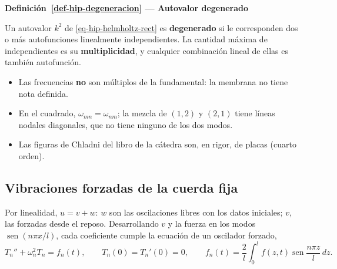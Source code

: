 \documentclass[
  spanish,
  a4paper,
]{scrbook}
\providecommand{\tightlist}{%
  \setlength{\itemsep}{0pt}\setlength{\parskip}{0pt}}
\theoremstyle{definition}
\theoremstyle{plain}
\theoremstyle{definition}
\theoremstyle{plain}
\theoremstyle{definition}
\theoremstyle{remark}
\begin{document}
\begin{tcolorbox}[enhanced jigsaw, arc=.35mm, bottomrule=.15mm, breakable, colback=white, colframe=quarto-callout-note-color-frame, left=2mm, leftrule=.75mm, opacityback=0, rightrule=.15mm, toprule=.15mm]
\begin{minipage}[t]{5.5mm}
\textcolor{quarto-callout-note-color}{\faInfo}
\end{minipage}%
\begin{minipage}[t]{\textwidth - 5.5mm}

\vspace{-3mm}\textbf{Definición~\ref{def-hip-degeneracion} --- Autovalor degenerado}\vspace{3mm}

Un autovalor \(k^2\) de \ref{eq-hip-helmholtz-rect} es
\textbf{degenerado} si le corresponden dos o más autofunciones
linealmente independientes. La cantidad máxima de independientes es su
\textbf{multiplicidad}, y cualquier combinación lineal de ellas es
también autofunción.

\end{minipage}%
\end{tcolorbox}

\begin{itemize}
\tightlist
\item
  Las frecuencias \textbf{no} son múltiplos de la fundamental: la
  membrana no tiene nota definida.
\item
  En el cuadrado, \(\omega_{mn} = \omega_{nm}\); la mezcla de \((1,2)\)
  y \((2,1)\) tiene líneas nodales diagonales, que no tiene ninguno de
  los dos modos.
\item
  Las figuras de Chladni del libro de la cátedra son, en rigor, de
  placas (cuarto orden).
\end{itemize}

\subsection{Vibraciones forzadas de la cuerda
fija}\label{sec-hip-resumen-6}

Por linealidad, \(u = v + w\): \(w\) son las oscilaciones libres con los
datos iniciales; \(v\), las forzadas desde el reposo. Desarrollando
\(v\) y la fuerza en los modos \(\operatorname{sen}(n\pi x/l)\), cada
coeficiente cumple la ecuación de un oscilador forzado, \[
T_n'' + \omega_n^2T_n = f_n(t),\qquad T_n(0) = T_n'(0) = 0,\qquad f_n(t) = \frac2l\int_0^lf(z,t)\operatorname{sen}\frac{n\pi z}{l}\,dz .
\]
\end{document}
